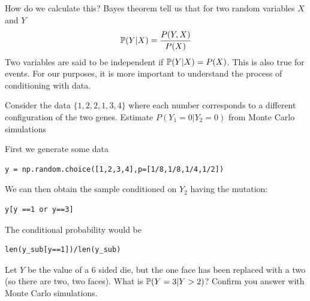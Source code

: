 How do we calculate this? Bayes theorem tell us that for two random variables $X$ and $Y$
\begin{equation}\label{eq:bayes}
\mathbb P(Y|X) = \frac{P(Y,X)}{P(X)}
\end{equation}
Two variables are said to be {\dfn independent} if $\mathbb P(Y|X)  = P(X)$. This is also true for events. For our purposes, it is more important to understand the process of conditioning with data. 

\begin{example}
Consider the data $\{1,2,2,1,3,4\}$ where each number corresponds to a different configuration of the two genes. Estimate $P(Y_1=0|Y_2=0)$ from Monte Carlo simulations
\end{example}
\begin{solution} 
First we generate some data
\begin{Verbatim}
y = np.random.choice([1,2,3,4],p=[1/8,1/8,1/4,1/2])
\end{Verbatim}
We can then obtain the sample conditioned on $Y_2$ having the mutation: 
\begin{Verbatim}
y[y ==1 or y==3]
\end{Verbatim}
The conditional probability would be 
\begin{Verbatim}
len(y_sub[y==1])/len(y_sub)
\end{Verbatim}
\end{solution}




%
%

\begin{exercise}
Let $Y$ be the value of a 6 sided die, but the one face has been replaced with a two (so there are two, two faces). What is $\mathbb P(Y=3|Y>2)$? Confirm you answer with Monte Carlo simulations.
\end{exercise}

